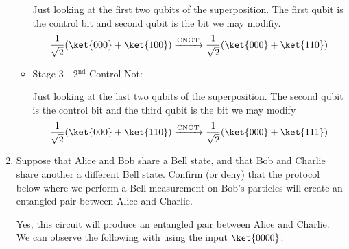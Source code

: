\documentclass[]{article}
\begin{document}
\begin{enumerate}
\begin{itemize}
      Just looking at the first two qubits of the superposition. The first qubit is the control bit and second qubit is the bit we may modifiy.
      \begin{gather*}
        \frac{1}{\sqrt{2}}(\ket{000} + \ket{100}) \xrightarrow{\text{CNOT}} \frac{1}{\sqrt{2}}(\ket{000} + \ket{110}) 
      \end{gather*}
    \item Stage 3 - 2$^{\text{nd}}$ Control Not:
      
      Just looking at the last two qubits of the superposition.  The second qubit is the control bit and the third qubit is the bit we may modify
      \begin{gather*}
        \frac{1}{\sqrt{2}}(\ket{000} + \ket{110}) \xrightarrow{\text{CNOT}} \frac{1}{\sqrt{2}}(\ket{000} + \ket{111}) 
      \end{gather*}
  \end{itemize}

  \item Suppose that Alice and Bob share a Bell state, and that
  Bob and Charlie share another a different Bell state. Confirm (or deny) that the protocol
  below where we perform a Bell measurement on Bob’s particles will create an entangled
  pair between Alice and Charlie.

  Yes, this circuit will produce an entangled pair between Alice and Charlie. We can observe the 
  following with using the input $\ket{0000}$:


\end{enumerate}
\end{document}
